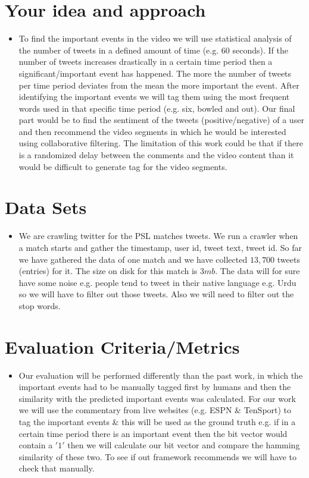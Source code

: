 \documentclass[11pt]{article}
\begin{document}
\section{Your idea and approach}
\begin{itemize}
\item To find the important events in the video we will use statistical analysis of the number of tweets in a defined amount of time (e.g. 60 seconds). If the number of tweets increases drastically in a certain time period then a significant/important event has happened. The more the number of tweets per time period deviates from the mean the more important the event. After identifying the important events we will tag them using the most frequent words used in that specific time period (e.g. six, bowled and out). Our final part would be to find the sentiment of the tweets (positive/negative) of a user and then recommend the video segments in which he would be interested using collaborative filtering.  The limitation of this work could be that if there is a randomized delay between the comments and the video content than it would be 	difficult to generate tag for the video segments.
\end{itemize}

\section{Data Sets}
\begin{itemize}
\item We are crawling twitter for the PSL matches tweets. We run a crawler when a match starts and gather the timestamp, user id, tweet text, tweet id. So far we have gathered the data of one match and we have collected $13,700$ tweets (entries) for it. The size on disk for this match is $3mb$. The data will for sure have some noise e.g. people tend to tweet in their native language e.g. Urdu so we will have to filter out those tweets. Also we will need to filter out the stop words.
\end{itemize}


\section{Evaluation Criteria/Metrics}
\begin{itemize}
\item Our evaluation will be performed differently than the past work, in which the important events had to be manually tagged first by humans and then the similarity with the predicted important events was calculated. For our work we will use the commentary from live websites (e.g. ESPN \& TenSport) to tag the important events \& this will be used as the ground truth e.g.  if in a certain time period there is an important event then the bit vector would contain a $'1'$ then we will calculate our bit vector and compare the hamming similarity of these two. To see if out framework recommends we will have to check that manually.
\end{itemize}
\end{document}
